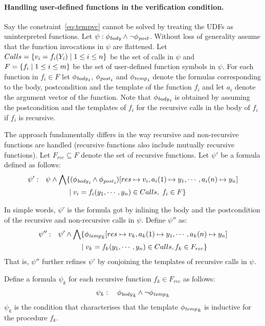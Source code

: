 \documentclass[a4paper,10pt]{article}
\begin{document}
\paragraph{Handling user-defined functions in the verification condition.}

Say the constraint~\ref{eq:tempvc} cannot be solved by treating the UDFs as uninterpreted functions. 
Let $\psi: \mathit{\phi_{body}} \wedge \neg \mathit{\phi_{post}}$. Without loss of generality assume that the function invocations in $\psi$ are flattened.
Let $Calls =\{ v_i = f_i(Y_i) \; | \; 1 \le i \le n \}$ be the set of calls in $\psi$ and
$F = \{ f_i \; | \; 1 \le i \le m \}$ be the set of user-defined function symbols in $\psi$. 
For each function in $f_i \in F$ let $\mathit{\phi_{body}}_i$, $\mathit{\phi_{post}}_i$ and $\mathit{\phi_{temp}}_i$ denote the formulas corresponding to the body, postcondition and the template of the function $f_i$ and let $a_i$ denote the argument vector of the function.
Note that $\mathit{\phi_{body}}_i$ is obtained by assuming the postcondition and the templates of $f_i$ for the recursive calls 
in the body of $f_i$ if $f_i$ is recursive.

The approach fundamentally differs in the way recursive and non-recursive functions are handled (recursive functions also include mutually recursive functions).
Let $F_{rec} \subseteq F$ denote the set of recursive functions.
Let $\psi'$ be a formula defined as follows: 
%
\begin{align*}
\psi': & \quad \psi \wedge  \bigwedge \{ (\mathit{\phi_{body}}_i \wedge \mathit{\phi_{post}}_i)[res \mapsto v_i, a_i(1) \mapsto y_1,\cdots, a_i(n) \mapsto y_n] \\
	   & \qquad \qquad  \; | \; v_i = f_i(y_1,\cdots,y_n) \in Calls, \;  f_i \in F \}
\end{align*}

In simple words, $\psi'$ is the formula got by inlining the body and the postcondition of 
the recursive and non-recursive calls in $\psi$.
Define $\psi''$ as:
%
\begin{align*}
\psi'': & \quad \psi' \wedge  \bigwedge \{ \mathit{\phi_{temp}}_k[res \mapsto v_k, a_k(1) \mapsto y_1,\cdots, a_k(n) \mapsto y_n] \\
	   & \qquad \qquad  \; | \; v_k = f_k(y_1,\cdots,y_n) \in Calls, f_k \in F_{rec} \}
\end{align*}
%
That is, $\psi''$ further refines $\psi'$ by conjoining the templates of recursive calls in $\psi$.

Define a formula $\psi_k$ for each recursive function $f_k \in F_{rec}$ as follows:
%
\begin{align*}
\psi_k: \quad \mathit{\phi_{body}}_k \wedge \neg \mathit{\phi_{temp}}_k
\end{align*}
%
$\psi_k$ is the condition that characterises that the template $\mathit{\phi_{temp}}_k$ is inductive for the procedure $f_k$.
\end{document}
